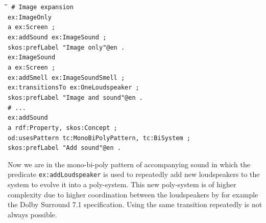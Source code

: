 \documentclass[11pt,a4paper]{article}
\newenvironment{code}{\tt \begin{tabbing}
\hskip12pt\=\hskip12pt\=\hskip12pt\=\hskip12pt\=\hskip5cm\=\hskip5cm\=\kill}
{\end{tabbing}}
\begin{document}
\begin{code}\tt
\# Image expansion\\[4pt]
ex:ImageOnly\\
\> a ex:Screen ;\\
\> ex:addSound ex:ImageSound ;\\
\> skos:prefLabel "Image only"@en .\\[4pt]
ex:ImageSound \\
\> a ex:Screen ; \\
\> ex:addSmell ex:ImageSoundSmell ;\\
\> ex:transitionsTo ex:OneLoudspeaker ;\\
\> skos:prefLabel "Image and sound"@en .\\[4pt]
\# ...\\[4pt]
ex:addSound\\
\> a rdf:Property, skos:Concept ;\\
\> od:usesPattern tc:MonoBiPolyPattern, tc:BiSystem ;\\
\> skos:prefLabel "Add sound"@en .
\end{code}

Now we are in the mono-bi-poly pattern of accompanying sound in which the
predicate \texttt{ex:addLoudspeaker} is used to repeatedly add new
loudspeakers to the system to evolve it into a poly-system. This new
poly-system is of higher complexity due to higher coordination between the
loudspeakers by for example the Dolby Surround 7.1 specification. Using the
same transition repeatedly is not always possible. 
\end{document}
